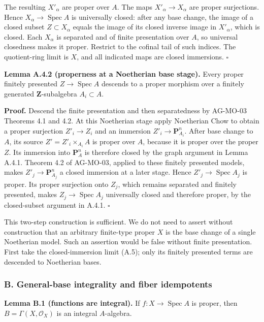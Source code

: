 \documentclass[11pt]{article}
\begin{document}
The resulting \(X'_\alpha\) are proper over \(A\). The maps
\(X'_\alpha\to X_\alpha\) are proper surjections. Hence
\(X_\alpha\to\operatorname{Spec}A\) is universally closed: after any
base change, the image of a closed subset \(Z\subset X_\alpha\) equals
the image of its closed inverse image in \(X'_\alpha\), which is closed.
Each \(X_\alpha\) is separated and of finite presentation over \(A\), so
universal closedness makes it proper. Restrict to the cofinal tail of
such indices. The quotient-ring limit is \(X\), and all indicated maps
are closed immersions. \(\square\)

\textbf{Lemma A.4.2 (properness at a Noetherian base stage).} Every
proper finitely presented \(Z\to\operatorname{Spec}A\) descends to a
proper morphism over a finitely generated \(\mathbf Z\)-subalgebra
\(A_i\subset A\).

\textbf{Proof.} Descend the finite presentation and then separatedness
by AG-MO-03 Theorems 4.1 and 4.2. At this Noetherian stage apply
Noetherian Chow to obtain a proper surjection \(Z'_i\to Z_i\) and an
immersion \(Z'_i\to\mathbf P^n_{A_i}\). After base change to \(A\), its
source \(Z'=Z'_i\times_{A_i}A\) is proper over \(A\), because it is
proper over the proper \(Z\). Its immersion into \(\mathbf P^n_A\) is
therefore closed by the graph argument in Lemma A.4.1. Theorem 4.2 of
AG-MO-03, applied to these finitely presented models, makes
\(Z'_j\to\mathbf P^n_{A_j}\) a closed immersion at a later stage. Hence
\(Z'_j\to\operatorname{Spec}A_j\) is proper. Its proper surjection onto
\(Z_j\), which remains separated and finitely presented, makes
\(Z_j\to\operatorname{Spec}A_j\) universally closed and therefore
proper, by the closed-subset argument in A.4.1. \(\square\)

This two-step construction is sufficient. We do not need to assert
without construction that an arbitrary finite-type proper \(X\) is the
base change of a single Noetherian model. Such an assertion would be
false without finite presentation. First take the closed-immersion limit
(A.5); only its finitely presented terms are descended to Noetherian
bases.

\subsubsection{B. General-base integrality and fiber
idempotents}\label{b.-general-base-integrality-and-fiber-idempotents}

\textbf{Lemma B.1 (functions are integral).} If
\(f:X\to\operatorname{Spec}A\) is proper, then
\(B=\Gamma(X,\mathcal O_X)\) is an integral \(A\)-algebra.
\end{document}
